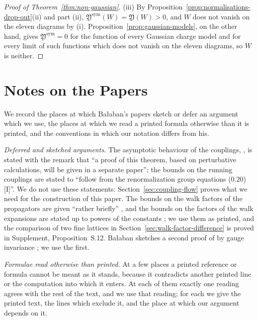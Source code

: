 \documentclass[11pt]{preprint}
\numberwithin{equation}{section}
\theoremstyle{definition}
\theoremstyle{remark}
\theoremstyle{plain}
\begin{document}
\begin{proof}[Proof of Theorem~\ref{thm:non-gaussian}]
(iii) By Proposition~\ref{prop:normalisations-drop-out}(ii) and part (ii), $\mathfrak Y^{\mathrm{sym}}(W) = \mathfrak Y(W) > 0$, and $W$ does not vanish on the eleven diagrams by (i). Proposition~\ref{prop:gaussian-models}, on the other hand, gives $\mathfrak Y^{\mathrm{sym}} = 0$ for the function of every Gaussian charge model and for every limit of such functions which does not vanish on the eleven diagrams, so $W$ is neither.
\end{proof}

\section{Notes on the Papers}\label{sec:notes-on-papers}

We record the places at which Ba{\l}aban's papers sketch or defer an argument which we use, the places at which we read a printed formula otherwise than it is printed, and the conventions in which our notation differs from his.

\emph{Deferred and sketched arguments.} The asymptotic behaviour of the couplings, \cite[Theorem~2, (0.31), p.~259]{BalabanRG1}, is stated with the remark that ``a proof of this theorem, based on perturbative calculations, will be given in a separate paper''; the bounds \cite[(2.6), (2.7), p.~255]{BalabanCRE} on the running couplings are stated to ``follow from the renormalization group equations (0.20) [I]''. We do not use these statements: Section~\ref{sec:coupling-flow} proves what we need for the construction of this paper. The bounds on the walk factors of the propagators are given ``rather briefly'' \cite[p.~409]{BalabanPBG}, and the bounds on the factors of the walk expansions are stated up to powers of the constants \cite[p.~413]{BalabanPBG}; we use them as printed, and the comparison of two fine lattices in Section~\ref{sec:walk-factor-difference} is proved in Supplement, Proposition~S.12. Ba{\l}aban sketches a second proof of \cite[Theorem~2]{BalabanCRE} by gauge invariance \cite[pp.~283--284]{BalabanCRE}; we use the first.

\emph{Formulae read otherwise than printed.} At a few places a printed reference or formula cannot be meant as it stands, because it contradicts another printed line or the computation into which it enters. At each of them exactly one reading agrees with the rest of the text, and we use that reading; for each we give the printed text, the lines which exclude it, and the place at which our argument depends on it.
\end{document}
